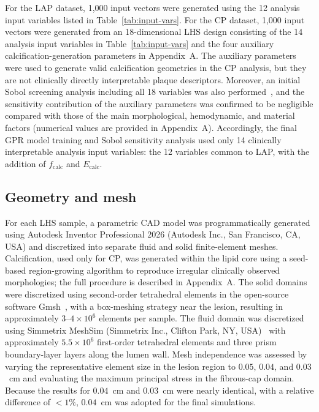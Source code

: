 \documentclass[master,english,final]{kaist-ucs}
\begin{document}
For the LAP dataset, 1{,}000 input vectors were generated using the 12 analysis input variables listed in Table~\ref{tab:input-vars}. For the CP dataset, 1{,}000 input vectors were generated from an 18-dimensional LHS design consisting of the 14 analysis input variables in Table~\ref{tab:input-vars} and the four auxiliary calcification-generation parameters in Appendix~A. The auxiliary parameters were used to generate valid calcification geometries in the CP analysis, but they are not clinically directly interpretable plaque descriptors. Moreover, an initial Sobol screening analysis including all 18 variables was also performed~\cite{sobol1993sensitivity, saltelli2002sobol}, and the sensitivity contribution of the auxiliary parameters was confirmed to be negligible compared with those of the main morphological, hemodynamic, and material factors (numerical values are provided in Appendix~A). Accordingly, the final GPR model training and Sobol sensitivity analysis used only 14 clinically interpretable analysis input variables: the 12 variables common to LAP, with the addition of $f_\mathrm{calc}$ and $E_\mathrm{calc}$.

\subsection{Geometry and mesh}
For each LHS sample, a parametric CAD model was programmatically generated using Autodesk Inventor Professional 2026 (Autodesk Inc., San Francisco, CA, USA) and discretized into separate fluid and solid finite-element meshes. Calcification, used only for CP, was generated within the lipid core using a seed-based region-growing algorithm to reproduce irregular clinically observed morphologies; the full procedure is described in Appendix~A. The solid domains were discretized using second-order tetrahedral elements in the open-source software Gmsh~\cite{geuzaine2009gmsh}, with a box-meshing strategy near the lesion, resulting in approximately $3$--$4\times10^6$ elements per sample. The fluid domain was discretized using Simmetrix MeshSim (Simmetrix Inc., Clifton Park, NY, USA)~\cite{simmetrix_meshsim} with approximately $5.5\times10^6$ first-order tetrahedral elements and three prism boundary-layer layers along the lumen wall. Mesh independence was assessed by varying the representative element size in the lesion region to $0.05$, $0.04$, and $0.03$~cm and evaluating the maximum principal stress in the fibrous-cap domain. Because the results for $0.04$~cm and $0.03$~cm were nearly identical, with a relative difference of $<1\%$, $0.04$~cm was adopted for the final simulations.
\end{document}

